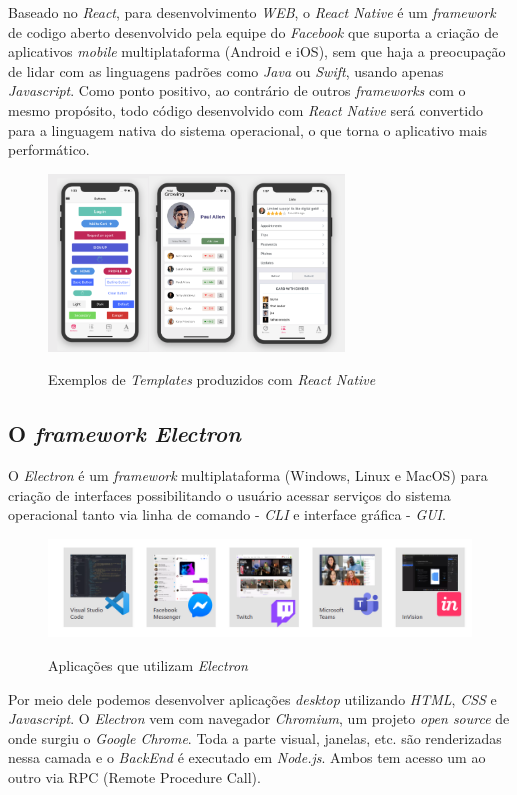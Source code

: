 Baseado no \textit{React}, para desenvolvimento \textit{WEB}, o \textit{React Native} é um \textit{framework} de codigo aberto desenvolvido pela equipe do \textit{Facebook} que suporta a criação de aplicativos \textit{mobile} multiplataforma (Android e iOS), sem que haja a preocupação de lidar com as linguagens padrões como \textit{Java} ou \textit{Swift}, usando apenas \textit{Javascript}. Como ponto positivo, ao contrário de outros \textit{frameworks} com o mesmo propósito, todo código desenvolvido com \textit{React Native} será convertido para a linguagem nativa do sistema operacional, o que torna o aplicativo mais performático.

\begin{figure}[H]
	\centering
	\caption{Exemplos de \textit{Templates} produzidos com \textit{React Native}}
	\includegraphics[width=0.7\textwidth]{figuras/react_native_elements.png}
	\label{fig:youcto-fluxo}
\end{figure} 

\subsection{O \textit{framework Electron}}

O \textit{Electron} é um \textit{framework} multiplataforma (Windows, Linux e MacOS) para criação de interfaces possibilitando o usuário acessar serviços do sistema operacional tanto via linha de comando - \textit{CLI} e interface gráfica - \textit{GUI}.

\begin{figure}[H]
	\centering
	\caption{Aplicações que utilizam \textit{Electron}}
	\includegraphics[width=1.0\textwidth]{figuras/electron_apps.png}
	\label{fig:youcto-fluxo}
\end{figure} 

Por meio dele podemos desenvolver aplicações \textit{desktop} utilizando \textit{HTML}, \textit{CSS} e \textit{Javascript}. O \textit{Electron} vem com navegador \textit{Chromium}, um projeto \textit{open source} de onde surgiu o \textit{Google Chrome}. Toda a parte visual, janelas, etc. são renderizadas nessa camada e o \textit{BackEnd} é executado em \textit{Node.js}. Ambos tem acesso um ao outro via RPC (Remote Procedure Call).



